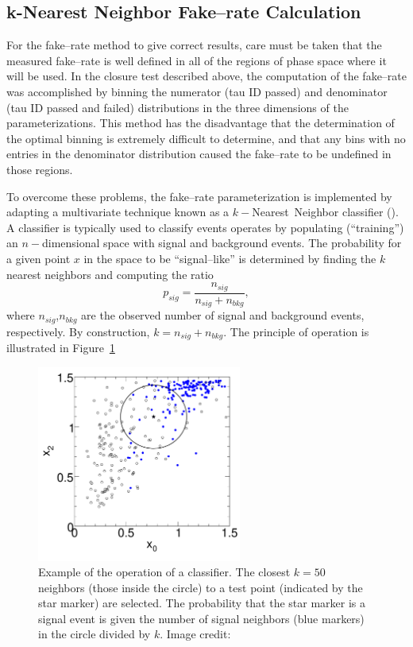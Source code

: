 \subsection{k-Nearest Neighbor Fake--rate Calculation}
\label{sec:KNN}
For the fake--rate method to give correct results, care must be taken that the
measured fake--rate is well defined in all of the regions of phase space where
it will be used.  In the closure test described above, the computation of the
fake--rate was accomplished by binning the numerator (tau ID passed) and
denominator (tau ID passed and failed) distributions in the three dimensions of
the parameterizations. This method has the disadvantage that the determination
of the optimal binning is extremely difficult to determine, and that any
bins with no entries in the denominator distribution caused the fake--rate to be
undefined in those regions.

To overcome these problems, the fake--rate parameterization is implemented by
adapting a multivariate technique known as a $k-$Nearest~Neighbor classifier
(\kNN).  A \kNN classifier is typically used to classify events operates by
populating (``training'') an $n-$dimensional space with signal and background
events.  The probability for a given point $x$ in the space to be
``signal--like'' is determined by finding the $k$ nearest neighbors and
computing the ratio
\begin{equation}
  p_{sig} = \frac{n_{sig}}{n_{sig} + n_{bkg}},
  \label{eq:KNNEquation}
\end{equation}
where $n_{sig}$,$n_{bkg}$ are the observed number of signal and background events,
respectively. By construction, $k = n_{sig} + n_{bkg}$.  The principle of
operation is illustrated in Figure~\ref{fig:KNN}
\begin{figure}
  \centering
  \includegraphics[width=0.6\textwidth]{backgrounds_chapter/figures/knn_3d_s13_b7_x02.pdf}
  \caption[$k-$Nearest Neighbor classifier example]{Example of the operation of
  a \kNN classifier.  The closest $k=50$ neighbors (those inside the circle) to a
  test point (indicated by the star marker) are selected. The probability that
  the star marker is a signal event is given the number of signal neighbors (blue
  markers) in the circle divided by $k$. Image credit:~\cite{TMVA}}
  \label{fig:KNN}
\end{figure}

